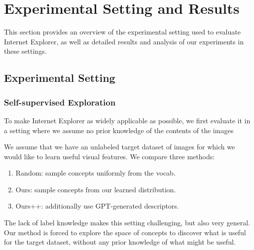 \chapter{Experimental Setting and Results}
This section provides an overview of the experimental setting used to evaluate Internet Explorer, as well as detailed results and analysis of our experiments in these settings.

\section{Experimental Setting}
\subsection{Self-supervised Exploration}
To make Internet Explorer as widely applicable as possible, we first evaluate it in a setting where we assume no prior knowledge of the contents of the images 




We assume that we have an unlabeled target dataset of images for which we would like to learn useful visual features. We compare three methods:
\begin{enumerate}
    \item Random: sample concepts uniformly from the vocab. 
    \item Ours: sample concepts from our learned distribution. 
    \item Ours++: additionally use GPT-generated descriptors.
\end{enumerate}
The lack of label knowledge makes this setting challenging, but also very general. Our method is forced to explore the space of concepts to discover what is useful for the target dataset, without any prior knowledge of what might be useful.

